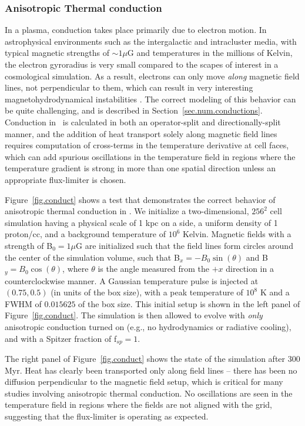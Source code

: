 \subsubsection{Anisotropic Thermal conduction}
\label{sec.tests.conduct}

In a plasma, conduction takes place primarily due to electron motion.
In astrophysical environments such as the intergalactic and
intracluster media, with typical magnetic strengths of $\sim 1 \mu$G
and temperatures in the millions of Kelvin, the electron gyroradius is
very small compared to the scapes of interest in a cosmological
simulation.  As a result, electrons can only move \textit{along}
magnetic field lines, not perpendicular to them, which can result in
very interesting magnetohydrodynamical instabilities
\citep[e.g.,][]{2008ApJ...677L...9P,2008ApJ...688..905P}. 
 The correct modeling of this behavior can be quite challenging, and is described in 
Section~\ref{sec.num.conductions}.  Conduction in \enzo\ is calculated
in both an operator-split and directionally-split manner, and the
addition of heat transport solely along magnetic field lines requires
computation of cross-terms in the temperature derivative at cell
faces, which can add spurious oscillations in the temperature field in
regions where the temperature gradient is strong in more than one
spatial direction unless an appropriate flux-limiter \citep[such as that
of][]{1977JCoPh..23..263V} is chosen.

Figure~\ref{fig.conduct} shows a test that demonstrates the
correct behavior of anisotropic thermal conduction in \enzo.  We
initialize a two-dimensional, $256^2$ cell simulation having a physical
scale of 1 kpc on a side, a uniform density of 1 proton/cc, and a
background temperature of $10^6$ Kelvin.  Magnetic fields with a
strength of  B$_0 = 1 \mu$G are initialized such that the field lines form
circles around the center of the simulation volume, such that B$_x =
-B_0\sin(\theta)$ and B$_y = B_0\cos(\theta)$, where $\theta$ is the
angle measured from the $+x$ direction in a counterclockwise manner.
A Gaussian temperature pulse is injected at $(0.75, 0.5)$ (in units of the box
size), with a peak temperature of $10^8$ K and a FWHM of $0.015625$ of
the box size.  This initial setup is shown in the left panel of
Figure~\ref{fig.conduct}.  The simulation is then allowed to evolve
with \textit{only} anisotropic conduction turned on (e.g.,
no hydrodynamics or radiative cooling), and with a Spitzer fraction of
f$_{sp} = 1$.  

The right panel of Figure~\ref{fig.conduct} shows the state of the
simulation after 300 Myr.  Heat has clearly been transported only along
field lines -- there has been no diffusion perpendicular to the
magnetic field setup, which is critical for many studies involving
anisotropic thermal conduction.  No oscillations are seen in the
temperature field in regions where the fields are not aligned with the
grid, suggesting that the flux-limiter is operating as expected.

